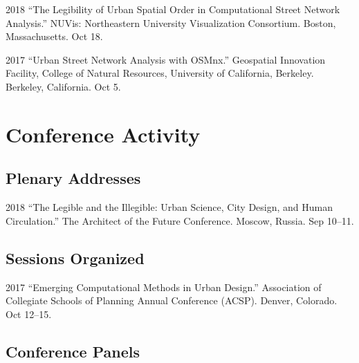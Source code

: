 \documentclass[12pt,letterpaper]{report}
\begin{document}
\begin{tablist}
	
\item[2018] \tab \enquote{The Legibility of Urban Spatial Order in Computational Street Network Analysis.} NUVis: Northeastern University Visualization Consortium. Boston, Massachusetts. Oct 18.
	
\item[2017] \tab \enquote{Urban Street Network Analysis with OSMnx.} Geospatial Innovation Facility, College of Natural Resources, University of California, Berkeley. Berkeley, California. Oct 5.

\end{tablist}


\section*{Conference Activity}

\subsection*{Plenary Addresses}

\begin{tablist}

\item[2018] \tab \enquote{The Legible and the Illegible: Urban Science, City Design, and Human Circulation.} The Architect of the Future Conference. Moscow, Russia. Sep 10--11.
	
\end{tablist}

\subsection*{Sessions Organized}

\begin{tablist}
	
\item[2017] \tab \enquote{Emerging Computational Methods in Urban Design.} Association of Collegiate Schools of Planning Annual Conference (ACSP). Denver, Colorado. Oct 12--15.
	
\end{tablist}

\subsection*{Conference Panels}
\end{document}
